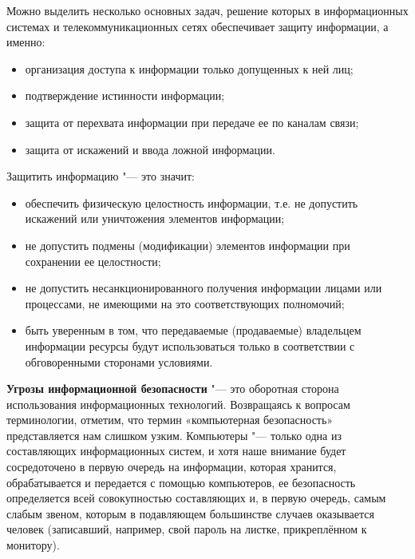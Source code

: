 Можно выделить несколько основных задач, решение которых в информационных системах и телекоммуникационных сетях обеспечивает 
защиту информации, а именно:
\begin{itemize}
    \item организация доступа к информации только допущенных к ней лиц;
    \item подтверждение истинности информации;
    \item защита от перехвата информации при передаче ее по каналам связи;
    \item защита от искажений и ввода ложной информации.
\end{itemize}
Защитить информацию "---  это значит:
\begin{itemize}
    \item обеспечить физическую целостность информации, т.е. не допустить искажений или уничтожения элементов информации;
    \item не допустить подмены (модификации) элементов информации при сохранении ее целостности;
    \item не допустить несанкционированного получения информации лицами или процессами, не имеющими на это соответствующих 
    полномочий;
    \item быть уверенным в том, что передаваемые (продаваемые) владельцем информации ресурсы будут использоваться только в 
    соответствии с обговоренными сторонами условиями.
\end{itemize}

\textbf{Угрозы информационной безопасности} "---  это оборотная сторона использования информационных технологий. Возвращаясь к вопросам 
терминологии, отметим, что термин «компьютерная безопасность» представляется нам слишком узким. Компьютеры "---  только одна из 
составляющих информационных систем, и хотя наше внимание будет сосредоточено в первую очередь на информации, которая 
хранится, обрабатывается и передается с помощью компьютеров, ее безопасность определяется всей совокупностью составляющих и, 
в первую очередь, самым слабым звеном, которым в подавляющем большинстве случаев оказывается человек (записавший, например, 
свой пароль на листке, прикреплённом к монитору)\cite{studfile}. 
\newpage
